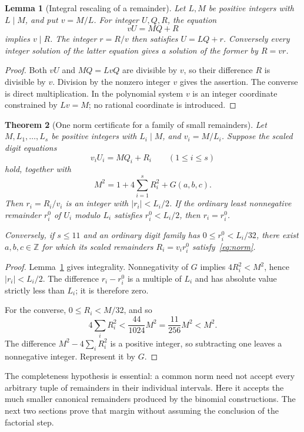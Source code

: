 \documentclass[11pt,letterpaper]{article}
\newtheorem{theorem}{Theorem}[section]
\newtheorem{lemma}[theorem]{Lemma}
\theoremstyle{remark}\newtheorem{remark}[theorem]{Remark}
\newcommand{\Z}{\mathbb Z}\newcommand{\N}{\mathbb N}
\begin{document}
\begin{lemma}[Integral rescaling of a remainder]\label{lem:rescale}
Let $L,M$ be positive integers with $L\mid M$, and put $v=M/L$.
For integer $U,Q,R$, the equation
\[
 vU=MQ+R
\]
implies $v\mid R$. The integer $r=R/v$ then satisfies $U=LQ+r$.
Conversely every integer solution of the latter equation gives a solution
of the former by $R=vr$.
\end{lemma}
\begin{proof}
Both $vU$ and $MQ=LvQ$ are divisible by $v$, so their difference $R$ is
divisible by $v$. Division by the nonzero integer $v$ gives the assertion.
The converse is direct multiplication. In the polynomial system $v$ is
an integer coordinate constrained by $Lv=M$; no rational coordinate is
introduced.
\end{proof}

\begin{theorem}[One norm certificate for a family of small remainders]
\label{thm:common}
Let $M,L_1,\ldots,L_s$ be positive integers with $L_i\mid M$, and
$v_i=M/L_i$. Suppose the scaled digit equations
\[
 v_iU_i=MQ_i+R_i \qquad(1\le i\le s)
\]
hold, together with
\begin{equation}\label{eq:norm}
 M^2=1+4\sum_{i=1}^sR_i^2+G(a,b,c).
\end{equation}
Then $r_i=R_i/v_i$ is an integer with $|r_i|<L_i/2$. If the ordinary
least nonnegative remainder $r_i^0$ of $U_i$ modulo $L_i$ satisfies
$r_i^0<L_i/2$, then $r_i=r_i^0$.

Conversely, if $s\le11$ and an ordinary digit family has
$0\le r_i^0<L_i/32$, there exist $a,b,c\in\Z$ for which its scaled
remainders $R_i=v_i r_i^0$ satisfy~\eqref{eq:norm}.
\end{theorem}
\begin{proof}
Lemma~\ref{lem:rescale} gives integrality. Nonnegativity of $G$ implies
$4R_i^2<M^2$, hence $|r_i|<L_i/2$. The difference $r_i-r_i^0$ is a
multiple of $L_i$ and has absolute value strictly less than $L_i$; it is
therefore zero.

For the converse, $0\le R_i<M/32$, and so
\[
 4\sum_iR_i^2<\frac{44}{1024}M^2
 =\frac{11}{256}M^2<M^2.
\]
The difference $M^2-4\sum_iR_i^2$ is a positive integer, so subtracting
one leaves a nonnegative integer. Represent it by $G$.
\end{proof}

The completeness hypothesis is essential: a common norm need not accept
every arbitrary tuple of remainders in their individual intervals.
Here it accepts the much smaller canonical remainders produced by the
binomial constructions. The next two sections prove that margin without
assuming the conclusion of the factorial step.
\end{document}
